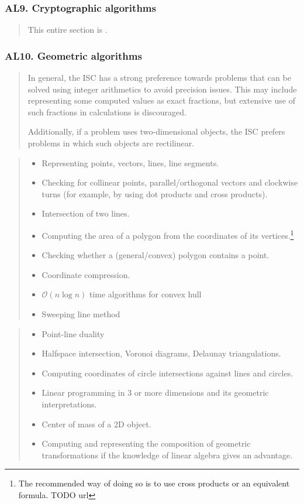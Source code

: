 \documentclass[a4paper,11pt,oneside]{article}
\newcommand{\cmark}{\ding{51}}%
\newcommand{\xmark}{\ding{55}}%
\newcommand{\ccode}{{\small\cmark\faFileText}}
\newcommand{\cnfoc}{{\small\faQuestion}}
\newcommand{\cexcl}{{\small\xmark}}
\newcommand{\Icodeonly}{\item[\hbox to 1.8em{\ccode\hfill}]}
\newcommand{\Iexcluded}{\item[\hbox to 1.8em{\cexcl\hfill}]}
\newenvironment{myitemize}{\begin{quote}\begin{itemize}\itemsep 0pt}{\end{itemize}\end{quote}}
\begin{document}
    \subsubsection*{AL9. Cryptographic algorithms}%

    \begin{quote}
    This entire section is \cnfoc.
    \end{quote}

    \subsubsection*{AL10. Geometric algorithms}%

    \begin{quote}
    In general, the ISC has a strong preference towards problems that can be solved using integer
    arithmetics to avoid precision issues. This may include representing some computed values as 
    exact fractions, but extensive use of such fractions in calculations is discouraged.

    Additionally, if a problem uses two-dimensional objects, the ISC prefers problems in which such objects are rectilinear.
    \end{quote}

    \begin{myitemize}
    \Icodeonly Representing points, vectors, lines, line segments.
    \Icodeonly Checking for collinear points, parallel/orthogonal vectors and clockwise turns (for example, by using dot products and cross products).
    \Icodeonly Intersection of two lines.
    \Icodeonly Computing the area of a polygon from the coordinates of its vertices.\footnote{The recommended way of doing so is to use cross products or an equivalent formula. TODO url}
    \Icodeonly Checking whether a (general/convex) polygon contains a point.
    \Icodeonly Coordinate compression.
    \Icodeonly $\mathcal{O}(n\log{n})$ time algorithms for convex hull
    \Icodeonly Sweeping line method
    \end{myitemize}
  
    \begin{myitemize}
    \Iexcluded Point-line duality
    \Iexcluded Halfspace intersection, Voronoi diagrams, Delaunay triangulations.
    \Iexcluded Computing coordinates of circle intersections against lines and circles.
    \Iexcluded Linear programming in 3 or more dimensions and its geometric interpretations.
    \Iexcluded Center of mass of a 2D object.
    \Iexcluded Computing and representing the composition of geometric transformations if the knowledge of linear algebra gives an advantage.
    \end{myitemize}
\end{document}
